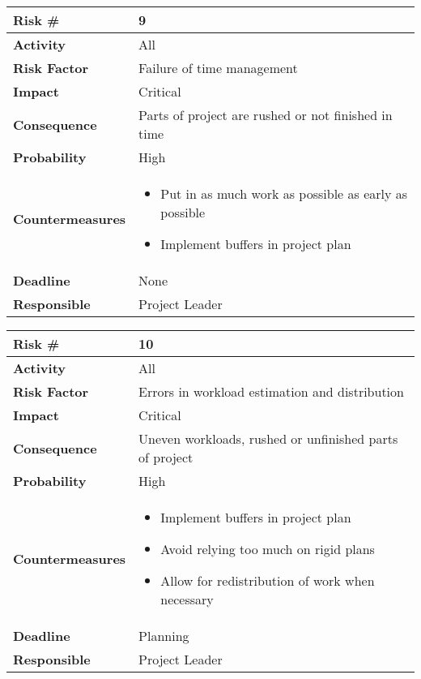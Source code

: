 \begin{tabularx}{\textwidth}{ | l | X | }
\hline
\textbf{Risk \#} & 9 \\ \hline
\textbf{Activity} & All \\ \hline
\textbf{Risk Factor} & Failure of time management \\ \hline
\textbf{Impact} & Critical \\ \hline
\textbf{Consequence} & Parts of project are rushed or not finished in time \\ \hline
\textbf{Probability} & High \\ \hline
\textbf{Countermeasures} & \begin{itemize}
  \item Put in as much work as possible as early as possible
  \item Implement buffers in project plan
\end{itemize}  \\ \hline
\textbf{Deadline} &  None \\ \hline
\textbf{Responsible} & Project Leader \\ \hline
\end{tabularx}

\begin{tabularx}{\textwidth}{ | l | X | }
\hline
\textbf{Risk \#} & 10 \\ \hline
\textbf{Activity} & All \\ \hline
\textbf{Risk Factor} & Errors in workload estimation and distribution \\ \hline
\textbf{Impact} & Critical \\ \hline
\textbf{Consequence} & Uneven workloads, rushed or unfinished parts of project \\ \hline
\textbf{Probability} & High \\ \hline
\textbf{Countermeasures} & \begin{itemize}
  \item Implement buffers in project plan
  \item Avoid relying too much on rigid plans
  \item Allow for redistribution of work when necessary
\end{itemize}  \\ \hline
\textbf{Deadline} &  Planning \\ \hline
\textbf{Responsible} & Project Leader \\ \hline
\end{tabularx}




